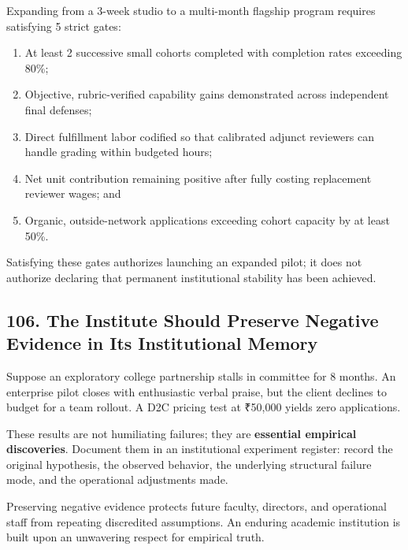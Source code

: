Expanding from a 3-week studio to a multi-month flagship program requires satisfying 5 strict gates:
\begin{enumerate}
    \item At least 2 successive small cohorts completed with completion rates exceeding 80\%;
    \item Objective, rubric-verified capability gains demonstrated across independent final defenses;
    \item Direct fulfillment labor codified so that calibrated adjunct reviewers can handle grading within budgeted hours;
    \item Net unit contribution remaining positive after fully costing replacement reviewer wages; and
    \item Organic, outside-network applications exceeding cohort capacity by at least 50\%.
\end{enumerate}

Satisfying these gates authorizes launching an expanded pilot; it does not authorize declaring that permanent institutional stability has been achieved.

\subsection*{106. The Institute Should Preserve Negative Evidence in Its Institutional Memory}

Suppose an exploratory college partnership stalls in committee for 8 months. An enterprise pilot closes with enthusiastic verbal praise, but the client declines to budget for a team rollout. A D2C pricing test at ₹50,000 yields zero applications.

These results are not humiliating failures; they are \textbf{essential empirical discoveries}. Document them in an institutional experiment register: record the original hypothesis, the observed behavior, the underlying structural failure mode, and the operational adjustments made.

Preserving negative evidence protects future faculty, directors, and operational staff from repeating discredited assumptions. An enduring academic institution is built upon an unwavering respect for empirical truth.
